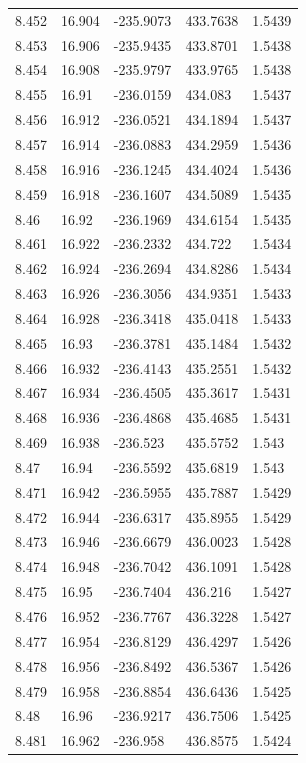 \begin{tabular}{lllll}
8.452 & 16.904 & -235.9073 & 433.7638 & 1.5439 \\
8.453 & 16.906 & -235.9435 & 433.8701 & 1.5438 \\
8.454 & 16.908 & -235.9797 & 433.9765 & 1.5438 \\
8.455 & 16.91 & -236.0159 & 434.083 & 1.5437 \\
8.456 & 16.912 & -236.0521 & 434.1894 & 1.5437 \\
8.457 & 16.914 & -236.0883 & 434.2959 & 1.5436 \\
8.458 & 16.916 & -236.1245 & 434.4024 & 1.5436 \\
8.459 & 16.918 & -236.1607 & 434.5089 & 1.5435 \\
8.46 & 16.92 & -236.1969 & 434.6154 & 1.5435 \\
8.461 & 16.922 & -236.2332 & 434.722 & 1.5434 \\
8.462 & 16.924 & -236.2694 & 434.8286 & 1.5434 \\
8.463 & 16.926 & -236.3056 & 434.9351 & 1.5433 \\
8.464 & 16.928 & -236.3418 & 435.0418 & 1.5433 \\
8.465 & 16.93 & -236.3781 & 435.1484 & 1.5432 \\
8.466 & 16.932 & -236.4143 & 435.2551 & 1.5432 \\
8.467 & 16.934 & -236.4505 & 435.3617 & 1.5431 \\
8.468 & 16.936 & -236.4868 & 435.4685 & 1.5431 \\
8.469 & 16.938 & -236.523 & 435.5752 & 1.543 \\
8.47 & 16.94 & -236.5592 & 435.6819 & 1.543 \\
8.471 & 16.942 & -236.5955 & 435.7887 & 1.5429 \\
8.472 & 16.944 & -236.6317 & 435.8955 & 1.5429 \\
8.473 & 16.946 & -236.6679 & 436.0023 & 1.5428 \\
8.474 & 16.948 & -236.7042 & 436.1091 & 1.5428 \\
8.475 & 16.95 & -236.7404 & 436.216 & 1.5427 \\
8.476 & 16.952 & -236.7767 & 436.3228 & 1.5427 \\
8.477 & 16.954 & -236.8129 & 436.4297 & 1.5426 \\
8.478 & 16.956 & -236.8492 & 436.5367 & 1.5426 \\
8.479 & 16.958 & -236.8854 & 436.6436 & 1.5425 \\
8.48 & 16.96 & -236.9217 & 436.7506 & 1.5425 \\
8.481 & 16.962 & -236.958 & 436.8575 & 1.5424 \\

\end{tabular}
